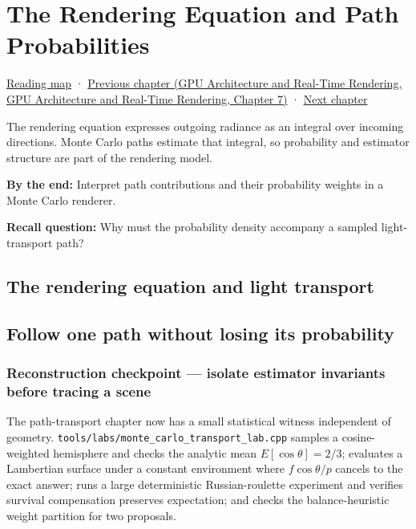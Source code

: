 \hypertarget{03-visual-computing-i-ch007}{}
\chapter{The Rendering Equation and Path Probabilities}\label{stagechapter:03-visual-computing-i-ch007}\label{03-visual-computing-i-ch007-the-rendering-equation-and-path-probabilities}

\hyperref[volume-reading-map]{Reading map} · \href{../06-GPU-Architecture-and-Real-Time-Rendering/main.pdf\#nameddest=03-visual-computing-i-ch006-from-material-data-to-gpu-bindings}{Previous chapter (GPU Architecture and Real-Time Rendering, GPU Architecture and Real-Time Rendering, Chapter 7)} · \hyperref[03-visual-computing-i-ch008-sampling-directions-and-light-transport]{Next chapter}

The rendering equation expresses outgoing radiance as an integral over incoming directions. Monte Carlo paths estimate that integral, so probability and estimator structure are part of the rendering model.

\textbf{By the end:} Interpret path contributions and their probability weights in a Monte Carlo renderer.

\textbf{Recall question:} Why must the probability density accompany a sampled light-transport path?

\section{The rendering equation and light transport}\label{03-visual-computing-i-ch007-the-rendering-equation-and-light-transport}

\section{Follow one path without losing its probability}\label{03-visual-computing-i-ch007-follow-one-path-without-losing-its-probability}

\subsection{Reconstruction checkpoint --- isolate estimator invariants before tracing a scene}\label{03-visual-computing-i-ch007-reconstruction-checkpoint-isolate-estimator-invariants-before-tracing-a-scene}

The path-transport chapter now has a small statistical witness independent of geometry. \texttt{tools/labs/monte\_carlo\_transport\_lab.cpp} samples a cosine-weighted hemisphere and checks the analytic mean \(E[\cos\theta]=2/3\); evaluates a Lambertian surface under a constant environment where \(f\cos\theta/p\) cancels to the exact answer; runs a large deterministic Russian-roulette experiment and verifies survival compensation preserves expectation; and checks the balance-heuristic weight partition for two proposals.

